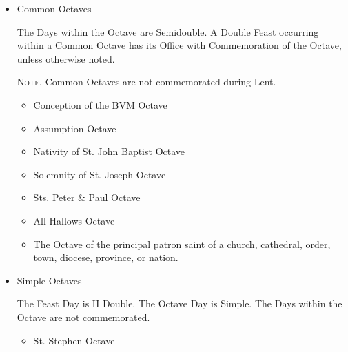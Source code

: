 \begin{itemize}
\begin{itemize}
            \item Common Octaves\par
            The Days within the Octave are Semidouble. A Double Feast occurring within a Common Octave has its Office with Commemoration of the Octave, unless otherwise noted.\par
            \textsc{Note,} Common Octaves are not commemorated during Lent.
                \begin{itemize}
                    \item Conception of the BVM Octave
                    \item Assumption Octave
                    \item Nativity of St. John Baptist Octave
                    \item Solemnity of St. Joseph Octave
                    \item Sts. Peter \& Paul Octave
                    \item All Hallows Octave
                    \item The Octave of the principal patron saint of a church, cathedral, order, town, diocese, province, or nation. 
                \end{itemize}
            \item Simple Octaves\par
            The Feast Day is II Double. The Octave Day is Simple. The Days within the Octave are not commemorated.
                \begin{itemize}
                    \item St. Stephen Octave

\end{itemize}
\end{itemize}
\end{itemize}
